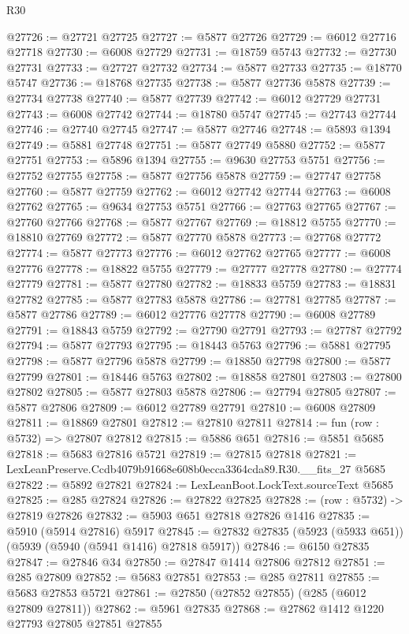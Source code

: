 \begin{lexlean}{R30}
\begin{coremodule}
@27726 := @27721 @27725
@27727 := @5877 @27726
@27729 := @6012 @27716 @27718
@27730 := @6008 @27729
@27731 := @18759 @5743
@27732 := @27730 @27731
@27733 := @27727 @27732
@27734 := @5877 @27733
@27735 := @18770 @5747
@27736 := @18768 @27735
@27738 := @5877 @27736 @5878
@27739 := @27734 @27738
@27740 := @5877 @27739
@27742 := @6012 @27729 @27731
@27743 := @6008 @27742
@27744 := @18780 @5747
@27745 := @27743 @27744
@27746 := @27740 @27745
@27747 := @5877 @27746
@27748 := @5893 @1394
@27749 := @5881 @27748
@27751 := @5877 @27749 @5880
@27752 := @5877 @27751
@27753 := @5896 @1394
@27755 := @9630 @27753 @5751
@27756 := @27752 @27755
@27758 := @5877 @27756 @5878
@27759 := @27747 @27758
@27760 := @5877 @27759
@27762 := @6012 @27742 @27744
@27763 := @6008 @27762
@27765 := @9634 @27753 @5751
@27766 := @27763 @27765
@27767 := @27760 @27766
@27768 := @5877 @27767
@27769 := @18812 @5755
@27770 := @18810 @27769
@27772 := @5877 @27770 @5878
@27773 := @27768 @27772
@27774 := @5877 @27773
@27776 := @6012 @27762 @27765
@27777 := @6008 @27776
@27778 := @18822 @5755
@27779 := @27777 @27778
@27780 := @27774 @27779
@27781 := @5877 @27780
@27782 := @18833 @5759
@27783 := @18831 @27782
@27785 := @5877 @27783 @5878
@27786 := @27781 @27785
@27787 := @5877 @27786
@27789 := @6012 @27776 @27778
@27790 := @6008 @27789
@27791 := @18843 @5759
@27792 := @27790 @27791
@27793 := @27787 @27792
@27794 := @5877 @27793
@27795 := @18443 @5763
@27796 := @5881 @27795
@27798 := @5877 @27796 @5878
@27799 := @18850 @27798
@27800 := @5877 @27799
@27801 := @18446 @5763
@27802 := @18858 @27801
@27803 := @27800 @27802
@27805 := @5877 @27803 @5878
@27806 := @27794 @27805
@27807 := @5877 @27806
@27809 := @6012 @27789 @27791
@27810 := @6008 @27809
@27811 := @18869 @27801
@27812 := @27810 @27811
@27814 := fun (row : @5732) => @27807 @27812
@27815 := @5886 @651
@27816 := @5851 @5685
@27818 := @5683 @27816 @5721
@27819 := @27815 @27818
@27821 := LexLeanPreserve.Ccdb4079b91668e608b0ecca3364cda89.R30.__fits_27 @5685
@27822 := @5892 @27821
@27824 := LexLeanBoot.LockText.sourceText @5685
@27825 := @285 @27824
@27826 := @27822 @27825
@27828 := (row : @5732) -> @27819 @27826
@27832 := @5903 @651 @27818 @27826 @1416
@27835 := @5910 (@5914 @27816) @5917
@27845 := @27832 @27835 (@5923 (@5933 @651)) (@5939 (@5940 (@5941 @1416) @27818 @5917))
@27846 := @6150 @27835
@27847 := @27846 @34
@27850 := @27847 @1414 @27806 @27812
@27851 := @285 @27809
@27852 := @5683 @27851
@27853 := @285 @27811
@27855 := @5683 @27853 @5721
@27861 := @27850 (@27852 @27855) (@285 (@6012 @27809 @27811))
@27862 := @5961 @27835
@27868 := @27862 @1412 @1220 @27793 @27805 @27851 @27855

\end{coremodule}
\end{lexlean}

